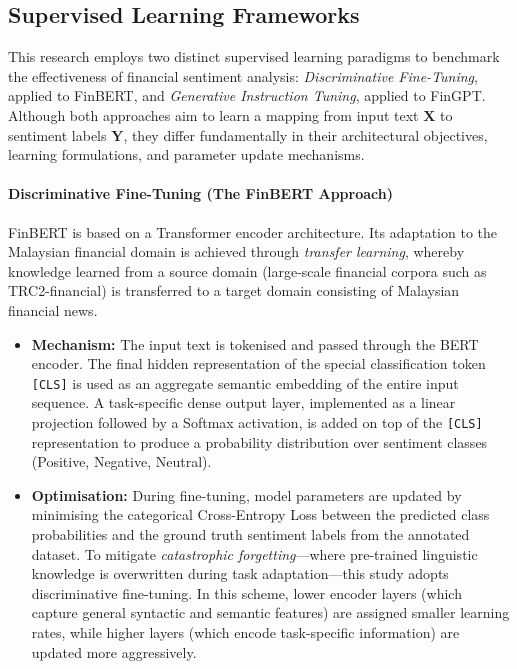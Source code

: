 \documentclass[12pt]{ucetd}
\begin{document}
\subsection{Supervised Learning Frameworks}

This research employs two distinct supervised learning paradigms to benchmark the effectiveness of financial sentiment analysis: \emph{Discriminative Fine-Tuning}, applied to FinBERT, and \emph{Generative Instruction Tuning}, applied to FinGPT. Although both approaches aim to learn a mapping from input text $\mathbf{X}$ to sentiment labels $\mathbf{Y}$, they differ fundamentally in their architectural objectives, learning formulations, and parameter update mechanisms.

\paragraph{Discriminative Fine-Tuning (The FinBERT Approach)}

FinBERT is based on a Transformer encoder architecture. Its adaptation to the Malaysian financial domain is achieved through \emph{transfer learning}, whereby knowledge learned from a source domain (large-scale financial corpora such as TRC2-financial) is transferred to a target domain consisting of Malaysian financial news.

\begin{itemize}
    \item \textbf{Mechanism:}
    The input text is tokenised and passed through the BERT encoder. The final hidden representation of the special classification token \texttt{[CLS]} is used as an aggregate semantic embedding of the entire input sequence. A task-specific dense output layer, implemented as a linear projection followed by a Softmax activation, is added on top of the \texttt{[CLS]} representation to produce a probability distribution over sentiment classes (Positive, Negative, Neutral).

    \item \textbf{Optimisation:}
    During fine-tuning, model parameters are updated by minimising the categorical Cross-Entropy Loss between the predicted class probabilities and the ground truth sentiment labels from the annotated dataset. To mitigate \emph{catastrophic forgetting}---where pre-trained linguistic knowledge is overwritten during task adaptation---this study adopts discriminative fine-tuning. In this scheme, lower encoder layers (which capture general syntactic and semantic features) are assigned smaller learning rates, while higher layers (which encode task-specific information) are updated more aggressively.
\end{itemize}
\end{document}
